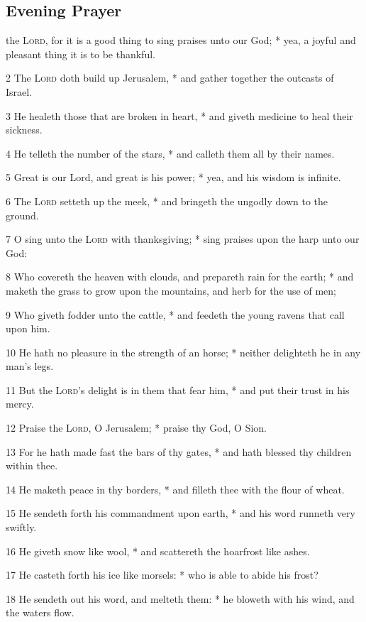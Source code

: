\subsection{Evening Prayer}
 the {\textsc{Lord}}, for it is a good thing to sing praises unto our God; * yea, a joyful and pleasant thing it is to be thankful.\par
2 The {\textsc{Lord}} doth build up Jerusalem, * and gather together the outcasts of Israel.\par
3 He healeth those that are broken in heart, * and giveth medicine to heal their sickness.\par
4 He telleth the number of the stars, * and calleth them all by their names.\par
5 Great is our Lord, and great is his power; * yea, and his wisdom is infinite.\par
6 The {\textsc{Lord}} setteth up the meek, * and bringeth the ungodly down to the ground.\par
7 O sing unto the {\textsc{Lord}} with thanksgiving; * sing praises upon the harp unto our God:\par
8 Who covereth the heaven with clouds, and prepareth rain for the earth; * and maketh the grass to grow upon the mountains, and herb for the use of men;\par
9 Who giveth fodder unto the cattle, * and feedeth the young ravens that call upon him.\par
10 He hath no pleasure in the strength of an horse; * neither delighteth he in any man's legs.\par
11 But the {\textsc{Lord}}'s delight is in them that fear him, * and put their trust in his mercy.\par
12 Praise the {\textsc{Lord}}, O Jerusalem; * praise thy God, O Sion.\par
13 For he hath made fast the bars of thy gates, * and hath blessed thy children within thee.\par
14 He maketh peace in thy borders, * and filleth thee with the flour of wheat.\par
15 He sendeth forth his commandment upon earth, * and his word runneth very swiftly.\par
16 He giveth snow like wool, * and scattereth the hoarfrost like ashes.\par
17 He casteth forth his ice like morsels: * who is able to abide his frost?\par
18 He sendeth out his word, and melteth them: * he bloweth with his wind, and the waters flow.\par
